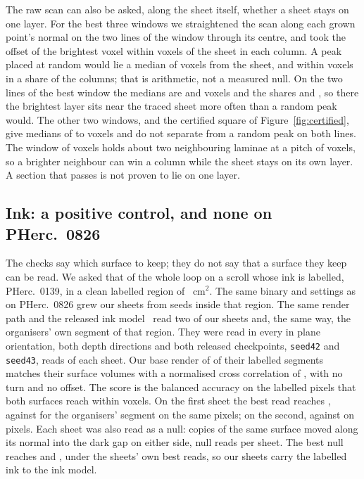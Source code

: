 The raw scan can also be asked, along the sheet itself, whether a sheet stays on one layer. For the best three windows we
straightened the scan along each grown point's normal on the two lines of the window through its centre, and took the
offset of the brightest voxel within \StraightWindow{} voxels of the sheet in each column. A peak placed at random would
lie a median of \StraightRandomMedian{} voxels from the sheet, and within \StraightNear{} voxels in a share
\StraightRandomShare{} of the columns; that is arithmetic, not a measured null. On the two lines of the best window the
medians are \StraightOneIMedian{} and \StraightOneJMedian{} voxels and the shares \StraightOneIShare{} and
\StraightOneJShare{}, so there the brightest layer sits near the traced sheet more often than a random peak would. The
other two windows, and the certified square of Figure~\ref{fig:certified}, give medians of \StraightOtherMedMin{} to
\StraightOtherMedMax{} voxels and do not separate from a random peak on both lines. The window of \StraightWindow{}
voxels holds about two neighbouring laminae at a pitch of \LaminaPitch{} voxels, so a brighter neighbour can win a
column while the sheet stays on its own layer. A section that passes is not proven to lie on one layer.

\subsection{Ink: a positive control, and none on PHerc.~0826}

The checks say which surface to keep; they do not say that a surface they keep can be read. We asked that of the whole
loop on a scroll whose ink is labelled, PHerc.~0139, in a clean labelled region of \PcRegion{}~cm$^2$. The same binary
and settings as on PHerc.~0826 grew our sheets from seeds inside that region. The same render path and the released ink
model~\cite{inkmodel} read two of our sheets and, the same way, the organisers' own segment of that region. They were
read in every in plane orientation, both depth directions and both released checkpoints, \texttt{seed42} and \texttt{seed43}, \PcReadsA{} reads of each
sheet. Our base render of \RefSegments{} of their labelled segments matches their surface volumes with a normalised
cross correlation of \RefNcc{}, with no turn and no offset. The score is the balanced accuracy on the labelled pixels
that both surfaces reach within \PcMatch{} voxels. On the first sheet the best read reaches \PcOursABa{}, against
\PcTheirsABa{} for the organisers' segment on the same \PcCommonA{} pixels; on the second, \PcOursBBa{} against
\PcTheirsBBa{} on \PcCommonB{} pixels. Each sheet was also read as a null: copies of the same surface moved along its
normal into the dark gap on either side, \PcNullReadsA{} null reads per sheet. The best null reaches \PcNullA{} and
\PcNullB{}, under the sheets' own best reads, so our sheets carry the labelled ink to the ink model.

